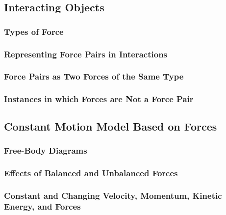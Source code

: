 \documentclass[../main-physics-problems.tex]{subfiles}
\begin{document}
\subsection{Interacting Objects}

\subsubsection{Types of Force}
\subsubsection{Representing Force Pairs in Interactions}
\subsubsection{Force Pairs as Two Forces of the Same Type}
\subsubsection{Instances in which Forces are Not a Force Pair}

\subsection{Constant Motion Model Based on Forces}

\subsubsection{Free-Body Diagrams}
\subsubsection{Effects of Balanced and Unbalanced Forces}
\subsubsection{Constant and Changing Velocity, Momentum, Kinetic Energy, and Forces}
\end{document}
